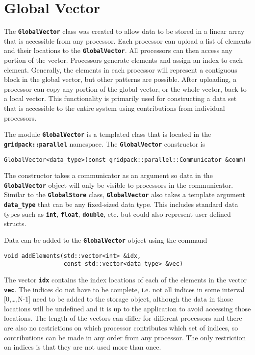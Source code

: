 \section{Global Vector}\label{global_vector}

The \texttt{\textbf{GlobalVector}} class was created to allow data to be stored
in a linear array that is accessible from any processor. Each processor can
upload a list of elements and their locations to the
\texttt{\textbf{GlobalVector}}. All processors can then access any portion of
the vector. Processors generate elements and assign an index to each element.
Generally, the elements in each processor will represent
a contiguous block in the global vector, but other patterns are possible. After
uploading, a processor can copy any portion of the global vector, or the whole vector,
back to a local vector. This functionality is primarily used for constructing a
data set that is accessible to the entire system using contributions from
individual processors.

The module \texttt{\textbf{GlobalVector}} is a templated class that is located
in the \texttt{\textbf{gridpack::parallel}} namespace. The
\texttt{\textbf{GlobalVector}} constructor is

{
\color{red}
\begin{Verbatim}[fontseries=b]
GlobalVector<data_type>(const gridpack::parallel::Communicator &comm)
\end{Verbatim}
}

The constructor takes a communicator as an argument so data in the
\texttt{\textbf{GlobalVector}} object will only be visible to processors in the
communicator. Similar to the \texttt{\textbf{GlobalStore}} class,
\texttt{\textbf{GlobalVector}} also takes a template argument \texttt{\textbf{data\_type}} that can be any fixed-sized data type. This includes standard data types such as \texttt{\textbf{int}}, \texttt{\textbf{float}}, \texttt{\textbf{double}}, etc. but could also represent user-defined structs.

Data can be added to the \texttt{\textbf{GlobalVector}} object using the command

{
\color{red}
\begin{Verbatim}[fontseries=b]
void addElements(std::vector<int> &idx,
                 const std::vector<data_type> &vec)
\end{Verbatim}
}

The vector \texttt{\textbf{idx}} contains the index locations of each of the
elements in the vector \texttt{\textbf{vec}}.  The indices do not have to
be complete, i.e. not all indices in some interval [0,{\dots},N-1] need to be
added to the storage object, although the data in those locations will be
undefined and it is up to the application to avoid accessing those locations.
The length of the vectors can differ for different
processors and there are also no restrictions on which processor contributes which
set of indices, so contributions can be made in any order from any processor. The only
restriction on indices is that they are not used more than once.

